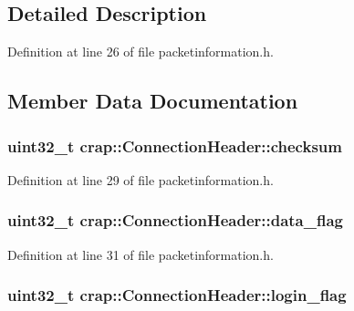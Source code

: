 \subsection{Detailed Description}


Definition at line 26 of file packetinformation.\+h.



\subsection{Member Data Documentation}
\hypertarget{structcrap_1_1_connection_header_ac75670d52163a19d001a9477041210e6}{}
\subsubsection[{checksum}]{\setlength{\rightskip}{0pt plus 5cm}uint32\+\_\+t crap\+::\+Connection\+Header\+::checksum}\label{structcrap_1_1_connection_header_ac75670d52163a19d001a9477041210e6}


Definition at line 29 of file packetinformation.\+h.

\hypertarget{structcrap_1_1_connection_header_af2c86c787276c6e0afb47229e4f27f49}{}
\subsubsection[{data\+\_\+flag}]{\setlength{\rightskip}{0pt plus 5cm}uint32\+\_\+t crap\+::\+Connection\+Header\+::data\+\_\+flag}\label{structcrap_1_1_connection_header_af2c86c787276c6e0afb47229e4f27f49}


Definition at line 31 of file packetinformation.\+h.

\hypertarget{structcrap_1_1_connection_header_a1916d0f7ec6cdfccb2268d9dcee6409e}{}
\subsubsection[{login\+\_\+flag}]{\setlength{\rightskip}{0pt plus 5cm}uint32\+\_\+t crap\+::\+Connection\+Header\+::login\+\_\+flag}\label{structcrap_1_1_connection_header_a1916d0f7ec6cdfccb2268d9dcee6409e}


